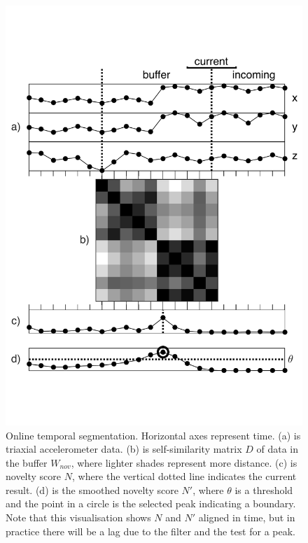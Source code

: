 \documentclass{nime-alternate_MANUSCRIPT} %
\begin{document}
\begin{figure}[t]
	\centering
		\includegraphics[trim={0.3cm 3.5cm 0.3cm 3.5cm}, clip=true, width=1\columnwidth]{fig_1_LO}
	\caption{Online temporal segmentation. Horizontal axes represent time. (a) is triaxial accelerometer data. (b) is self-similarity matrix $D$ of data in the buffer  $W_{nov}$, where lighter shades represent more distance. (c) is novelty score $N$, where the vertical dotted line indicates the current result. (d) is the smoothed novelty score $N'$, where $\theta$ is a threshold and the point in a circle is the selected peak indicating a  boundary. Note that this visualisation shows $N$ and $N'$ aligned in time, but in practice there will be a lag due to the filter and the test for a peak.}
	\label{fig_1}
\end{figure}
\end{document}

